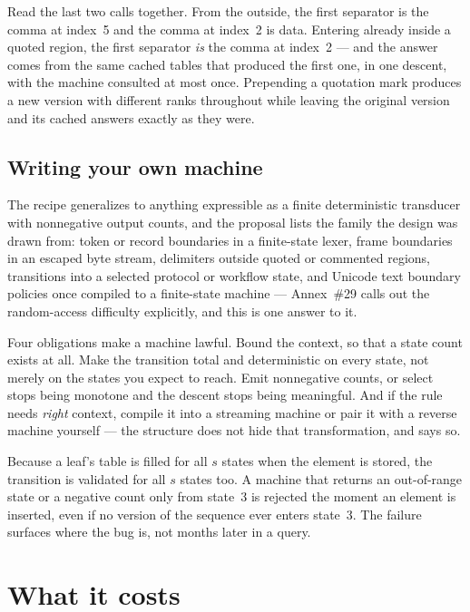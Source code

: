\documentclass[11pt,twoside,openright]{book}
\begin{document}
Read the last two calls together. From the outside, the first separator is the
comma at index~5 and the comma at index~2 is data. Entering already inside a
quoted region, the first separator \emph{is} the comma at index~2 --- and the
answer comes from the same cached tables that produced the first one, in one
descent, with the machine consulted at most once. Prepending a quotation mark
produces a new version with different ranks throughout while leaving the original
version and its cached answers exactly as they were.

\subsection{Writing your own machine}

The recipe generalizes to anything expressible as a finite deterministic
transducer with nonnegative output counts, and the proposal lists the family the
design was drawn from: token or record boundaries in a finite-state lexer, frame
boundaries in an escaped byte stream, delimiters outside quoted or commented
regions, transitions into a selected protocol or workflow state, and Unicode text
boundary policies once compiled to a finite-state machine --- Annex~\#29 calls out
the random-access difficulty explicitly, and this is one answer to it.

Four obligations make a machine lawful. Bound the context, so that a state count
exists at all. Make the transition total and deterministic on every state, not
merely on the states you expect to reach. Emit nonnegative counts, or select
stops being monotone and the descent stops being meaningful. And if the rule
needs \emph{right} context, compile it into a streaming machine or pair it with a
reverse machine yourself --- the structure does not hide that transformation, and
says so.

\begin{asidebox}
Because a leaf's table is filled for all $s$ states when the element is stored,
the transition is validated for all $s$ states too. A machine that returns an
out-of-range state or a negative count only from state~3 is rejected the moment
an element is inserted, even if no version of the sequence ever enters state~3.
The failure surfaces where the bug is, not months later in a query.
\end{asidebox}

\section{What it costs}
\end{document}
